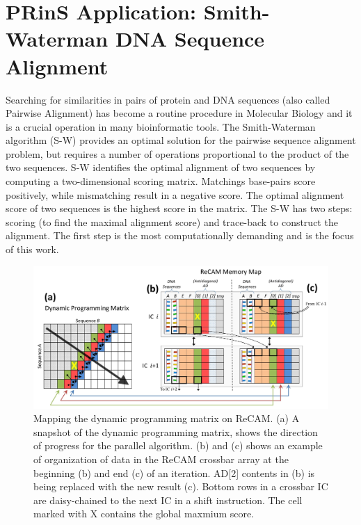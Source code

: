\documentclass{superfri}
\begin{document}
\section{PRinS Application: Smith-Waterman DNA Sequence Alignment}
\label{sec:smith_waterman}

Searching for similarities in pairs of protein and DNA sequences (also called Pairwise Alignment) has become a routine procedure in Molecular Biology and it is a crucial operation in many bioinformatic tools. The Smith-Waterman algorithm (S-W) \cite{smith1981identification} provides an optimal solution for the pairwise sequence alignment problem, but requires a number of operations proportional to the product of the two sequences. 
S-W identifies the optimal alignment of two sequences by computing a two-dimensional scoring matrix. Matchings base-pairs score positively, while mismatching result in a negative score. The optimal alignment score of two sequences is the highest score in the matrix. The S-W has two steps: scoring (to find the maximal alignment score) and trace-back to construct the alignment. The first step is the most computationally demanding and is the focus of this work.

\begin{figure}[h!]
	\centerline{\includegraphics[scale=0.6]{Figures/SW_on_ReCAM_Figure.jpg}}
	\caption{Mapping the dynamic programming matrix on ReCAM. (a) A snapshot of the dynamic programming matrix, shows the direction of progress for the parallel algorithm. (b) and (c) shows an example of organization of data in the ReCAM crossbar array at the beginning (b) and end (c) of an iteration. AD[2] contents in (b) is being replaced with the new result (c). Bottom rows in a crossbar IC are daisy-chained to the next IC in a shift instruction. The cell marked with X contains the global maxmium score.}
	\label{fig:SWonReCAM}
\end{figure}
\end{document}
